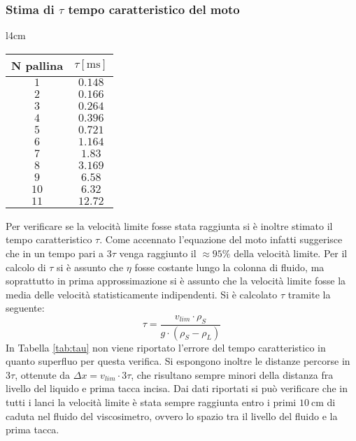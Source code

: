 \documentclass[a4paper,11pt,oneside]{article}
\begin{document}
\subsubsection*{Stima di $\tau$ tempo caratteristico del moto}
\begin{wraptable}{l}{4cm}
\centering
    \begin{tabular}{|c|c|}
        \hline
        \textbf{N pallina} & \textbf{$\tau [\si{\milli\second}]$} \\ \hline
        \rowcolor[rgb]{0.85,0.85,0.85}$1$ & $0.148$ \\ \hline
        $2$ & $0.166$ \\ \hline
        \rowcolor[rgb]{0.85,0.85,0.85}$3$ & $0.264$ \\ \hline
        $4$ & $0.396$ \\ \hline
        \rowcolor[rgb]{0.85,0.85,0.85}$5$ & $0.721$ \\ \hline
        $6$ & $1.164$ \\ \hline
        \rowcolor[rgb]{0.85,0.85,0.85}$7$ & $1.83$ \\ \hline
        $8$ & $3.169$ \\ \hline
        \rowcolor[rgb]{0.85,0.85,0.85}$9$ & $6.58$ \\ \hline
        $10$ & $6.32$ \\ \hline
        \rowcolor[rgb]{0.85,0.85,0.85}$11$ & $12.72$ \\ \hline
    \end{tabular}
    \caption{Tempo $\tau$}
    \label{tab:tau}
\end{wraptable}
Per verificare se la velocità limite fosse stata raggiunta si è inoltre stimato il tempo caratteristico $\tau$. Come accennato l'equazione del moto infatti suggerisce che in un tempo pari a $3\tau$ venga raggiunto il $\approx 95\%$ della velocità limite.
Per il calcolo di $\tau$ si è assunto che $\eta$ fosse costante lungo la colonna di fluido, ma soprattutto in prima approssimazione si è assunto che la velocità limite fosse la media delle velocità statisticamente indipendenti.
Si è calcolato $\tau$ tramite la seguente:
\begin{equation*}
    \tau = \frac{v_{lim} \cdot \rho_{S}}{g \cdot (\rho_{S} - \rho_{L})}
\end{equation*}
In Tabella \ref{tab:tau} non viene riportato l'errore del tempo caratteristico in quanto superfluo per questa verifica. Si espongono inoltre le distanze percorse in $3\tau$, ottenute da $\Delta x=v_{lim} \cdot 3 \tau$, che risultano sempre minori della distanza fra livello del liquido e prima tacca incisa.
Dai dati riportati si può verificare che in tutti i lanci la velocità limite è stata sempre raggiunta entro i primi $\SI{10}{\centi\meter}$ di caduta nel fluido del viscosimetro, ovvero lo spazio tra il livello del fluido e la prima tacca.%
\end{document}
